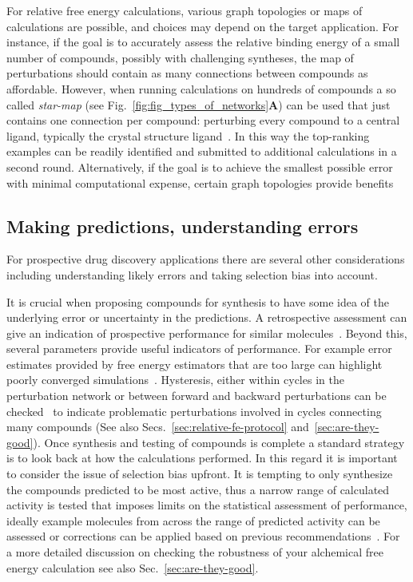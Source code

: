 \documentclass[9pt,bestpractices,pubversion]{livecoms}
\begin{document}
For relative free energy calculations, various graph topologies or maps of calculations are possible, and choices may depend on the target application. For instance, if the goal is to accurately assess the relative binding energy of a small number of compounds, possibly with challenging syntheses, the map of perturbations should contain as many connections between compounds as affordable. However, when running calculations on hundreds of compounds a so called \emph{star-map} (see Fig.~\ref{fig:fig_types_of_networks}\textbf{A}) can be used that just contains one connection per compound: perturbing every compound to a central ligand, typically the crystal structure ligand~\cite{konze2019reactionbased}. In this way the top-ranking examples can be readily identified and submitted to additional calculations in a second round. Alternatively, if the goal is to achieve the smallest possible error with minimal computational expense, certain graph topologies provide benefits~\cite{yang2020optimal, xu2019optimal}


\subsection{Making predictions, understanding errors}
\label{subsec:predictions}
For prospective drug discovery applications there are several other considerations including understanding likely errors and taking selection bias into account. 

It is crucial when proposing compounds for synthesis to have some idea of the underlying error or uncertainty in the predictions. A retrospective assessment can give an indication of prospective performance for similar molecules~\cite{ciordia2016application}. Beyond this, several parameters provide useful indicators of performance. For example error estimates provided by free energy estimators that are too large can highlight poorly converged simulations~\cite{perez-benito2019predicting}. Hysteresis, either within cycles in the perturbation network or between forward and backward perturbations can be checked~\cite{wang2013modeling} to indicate problematic perturbations involved in cycles connecting many compounds (See also Secs.~\ref{sec:relative-fe-protocol} and~\ref{sec:are-they-good}). Once synthesis and testing of compounds is complete a standard strategy is to look back at how the calculations performed. In this regard it is important to consider the issue of selection bias upfront. It is tempting to only synthesize the compounds predicted to be most active, thus a narrow range of calculated activity is tested that imposes limits on the statistical assessment of performance, ideally example molecules from across the range of predicted activity can be assessed or corrections can be applied based on previous recommendations~\cite{robert2017critical}. For a more detailed discussion on checking the robustness of your alchemical free energy calculation see also Sec.~\ref{sec:are-they-good}.
\end{document}

